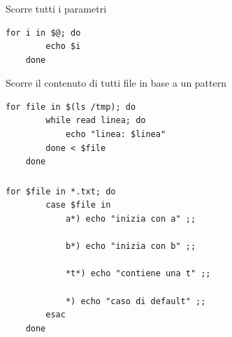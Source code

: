 \documentclass[../main.tex]{subfiles}
\begin{document}
\vspace{0.5cm}
\subsubsection{}
Scorre tutti i parametri
\begin{lstlisting}[style=bash]
    for i in $@; do
        echo $i
    done
\end{lstlisting}

\vspace{0.25cm}
Scorre il contenuto di tutti file in base a un pattern
\begin{lstlisting}[style=bash]
    for file in $(ls /tmp); do
        while read linea; do
            echo "linea: $linea"
        done < $file
    done
\end{lstlisting}

\pagebreak
\subsubsection{}
\begin{lstlisting}[style=bash]
    for $file in *.txt; do
        case $file in
            a*) echo "inizia con a" ;;

            b*) echo "inizia con b" ;;

            *t*) echo "contiene una t" ;;

            *) echo "caso di default" ;;
        esac
    done
\end{lstlisting}
\end{document}
